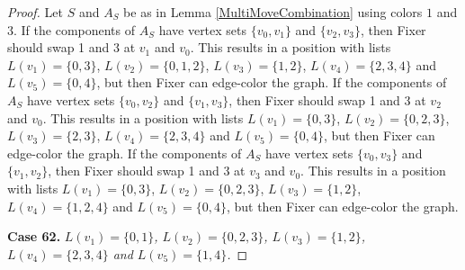 \documentclass[12pt]{amsart}
\theoremstyle{plain}
\theoremstyle{definition}
\theoremstyle{remark}
\begin{document}
\begin{proof}
Let $S$ and $A_S$ be as in Lemma \ref{MultiMoveCombination} using colors $1$ and $3$. If the components of $A_S$ have vertex sets $\{v_0, v_1\}$ and $\{v_2, v_3\}$, then Fixer should swap 1 and 3 at $v_1$ and $v_0$. This results in a position with lists $L(v_1) = \{0, 3\}$, $L(v_2) = \{0, 1, 2\}$, $L(v_3) = \{1, 2\}$, $L(v_4) = \{2, 3, 4\}$ and $L(v_5) = \{0, 4\}$, but then Fixer can edge-color the graph.
If the components of $A_S$ have vertex sets $\{v_0, v_2\}$ and $\{v_1, v_3\}$, then Fixer should swap 1 and 3 at $v_2$ and $v_0$. This results in a position with lists $L(v_1) = \{0, 3\}$, $L(v_2) = \{0, 2, 3\}$, $L(v_3) = \{2, 3\}$, $L(v_4) = \{2, 3, 4\}$ and $L(v_5) = \{0, 4\}$, but then Fixer can edge-color the graph.
If the components of $A_S$ have vertex sets $\{v_0, v_3\}$ and $\{v_1, v_2\}$, then Fixer should swap 1 and 3 at $v_3$ and $v_0$. This results in a position with lists $L(v_1) = \{0, 3\}$, $L(v_2) = \{0, 2, 3\}$, $L(v_3) = \{1, 2\}$, $L(v_4) = \{1, 2, 4\}$ and $L(v_5) = \{0, 4\}$, but then Fixer can edge-color the graph.

\noindent\textbf{Case 62.  }\textit{$L(v_1) = \{0, 1\}$, $L(v_2) = \{0, 2, 3\}$, $L(v_3) = \{1, 2\}$, $L(v_4) = \{2, 3, 4\}$ and $L(v_5) = \{1, 4\}$.}


\end{proof}
\end{document}
